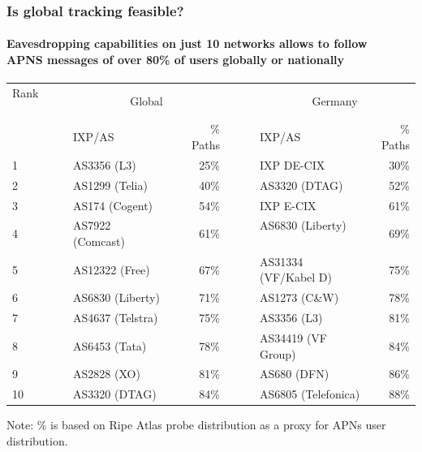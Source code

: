 \begin{frame}
\frametitle{Is global tracking feasible?}
\framesubtitle{Eavesdropping capabilities on just 10 networks allows to follow \\APNS messages of over 80\% of users globally or nationally}
\vspace{-10mm}
\captionsetup{justification=centering}
\begin{table}[!h]%
	\centering		
	\resizebox{\textwidth}{!}
	{\begin{tabular}{llrclr}
			\toprule
			Rank ~~~~~& \multicolumn{2}{c}{Global} && \multicolumn{2}{c}{Germany}	\\
			\cmidrule{2-3} \cmidrule{5-6}
			& IXP/AS  & \textSigma\% Paths &~~~& IXP/AS & \textSigma\% Paths   \\
			\midrule
			1 & AS3356 (L3)  & 25\%  && IXP DE-CIX & 30\% \\
			2 & AS1299 (Telia) & 40\%  && AS3320 (DTAG) & 52\% \\
			3 & AS174 (Cogent)  & 54\%  && IXP E-CIX & 61\% \\
			4 & AS7922 (Comcast)~~~  & 61\%  && AS6830 (Liberty) ~~~& 69\% \\
			5 & AS12322 (Free)  & 67\%  && AS31334 (VF/Kabel D) & 75\%\\
			6 & AS6830 (Liberty)  & 71\%  && AS1273 (C\&W)& 78\%\\
			7 & AS4637 (Telstra) & 75\%  && AS3356 (L3)  & 81\% \\
			8 & AS6453 (Tata) & 78\%  && AS34419 (VF Group)& 84\% \\
			9 & AS2828 (XO)  & 81\%  && AS680 (DFN) & 86\% \\
			10 & AS3320 (DTAG) & 84\% && AS6805 (Telefonica) & 88\% \\
			\bottomrule
	\end{tabular}}
	\label{tab:topnetworks}
\end{table}
\vspace{-3mm}
\small{Note: \% is based on Ripe Atlas probe distribution as a proxy for APNs user distribution.}
\end{frame}
\clearpage

